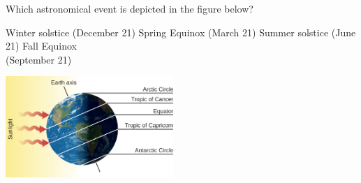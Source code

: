 \documentclass[addpoints]{exam}
\begin{document}
\begin{questions}
\question
Which astronomical event is depicted in the figure below?

\begin{minipage}{0.45\textwidth}
    \centering
    \begin{choices}
    \choice Winter solstice (December 21)
    \choice Spring Equinox (March 21)
    \correctchoice Summer solstice (June 21)
    \choice Fall Equinox\\ (September 21)
    \end{choices}
\end{minipage}%
\begin{minipage}{0.5\textwidth}
    \centering
    \includegraphics[width=2.5in]{Figures/Figure4.8.jpg}
\end{minipage}
\vspace{1em}






\end{questions}
\end{document}
